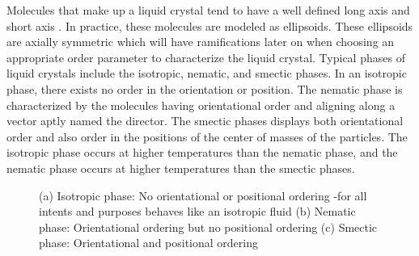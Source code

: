 \documentclass[preprint, aps]{revtex4-1}
\begin{document}
Molecules that make up a liquid crystal tend to have a well defined long axis 
and short axis \cite{andrienko06}. In practice, these molecules are modeled as
ellipsoids. These ellipsoids are axially symmetric which will have ramifications
later on when choosing an appropriate order parameter to characterize the liquid
crystal. Typical phases of liquid crystals include the isotropic, nematic, and 
smectic phases. In an isotropic phase, there exists no order in the orientation 
or position. The nematic phase is characterized by the molecules having 
orientational order and aligning along a vector aptly named the director. The 
smectic phases displays both orientational order and also order in the positions
of the center of masses of the particles. The isotropic phase occurs at higher 
temperatures than the nematic phase, and the nematic phase occurs at higher 
temperatures than the smectic phases.
	\begin{figure}[!htbp] 
		\centering
		\caption{(a) Isotropic phase: No orientational or positional ordering
		-for all intents and purposes behaves like an isotropic fluid (b)
		Nematic phase: Orientational ordering but no positional ordering (c) 
		Smectic phase: Orientational and positional ordering}
		\label{fig:phases}
	\end{figure}
\end{document}
